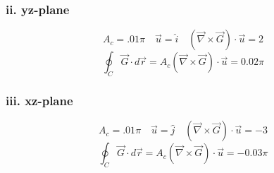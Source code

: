 \documentclass[11pt]{article}
\begin{document}
\subsubsection*{ii. yz-plane}
$$A_c = .01\pi \quad \vec{u} = \hat{i} \quad (\vec{\nabla}\times\vec{G})\cdot\vec{u} = 2$$
$$\oint_C \vec{G}\cdot d\vec{r} = A_c(\vec{\nabla}\times\vec{G})\cdot\vec{u} = 0.02 \pi$$
\subsubsection*{iii. xz-plane}
$$A_c = .01\pi \quad \vec{u} = \hat{j} \quad (\vec{\nabla}\times\vec{G})\cdot\vec{u} = -3$$
$$\oint_C \vec{G}\cdot d\vec{r} = A_c(\vec{\nabla}\times\vec{G})\cdot\vec{u} = -0.03 \pi$$
\end{document}
